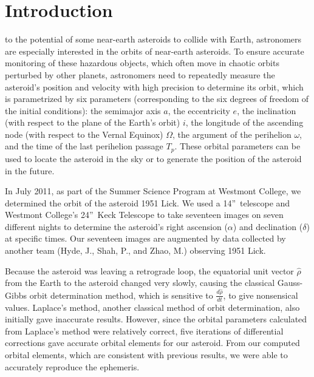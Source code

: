\documentclass[12pt,journal,compsoc]{IEEEtran}
\begin{document}
\IEEEdisplaynotcompsoctitleabstractindextext
\IEEEpeerreviewmaketitle

\section{Introduction}
to the potential of some near-earth asteroids to collide with Earth, 
astronomers are especially interested in the orbits of near-earth asteroids.
To ensure accurate monitoring of these hazardous objects, 
which often move in chaotic orbits perturbed by other planets, 
astronomers need to repeatedly measure the asteroid's position and velocity with high precision to determine its orbit,
which is parametrized by six parameters
(corresponding to the six degrees of freedom of the initial conditions): %
the semimajor axis $a$, 
the eccentricity $e$, 
the inclination (with respect to the plane of the Earth's orbit) $i$, 
the longitude of the ascending node (with respect to the Vernal Equinox) $\Omega$, 
the argument of the perihelion $\omega$, 
and the time of the last perihelion passage $T_p$.  
These orbital parameters can be used to locate the asteroid in the sky or to generate the position of the asteroid in the future.

In July 2011, as part of the Summer Science Program at Westmont College, 
we determined the orbit of the asteroid 1951 Lick. 
We used a 14''~telescope and Westmont College's 24''~Keck Telescope to take seventeen images on seven different nights 
to determine the asteroid's right ascension ($\alpha$) and declination ($\delta$) at specific times.
Our seventeen images are augmented by data collected by another team (Hyde, J., Shah, P., and Zhao, M.) observing 1951 Lick.

Because the asteroid was leaving a retrograde loop, 
the equatorial unit vector $\hat{\rho}$ from the Earth to the asteroid changed very slowly, 
causing the classical Gauss-Gibbs orbit determination method, which is sensitive to $\frac{d\hat{\rho}}{dt}$, to give nonsensical values.
Laplace's method, 
another classical method of orbit determination, 
also initially gave inaccurate results.  
However, since the orbital parameters calculated from Laplace's method were relatively correct, 
five iterations of differential corrections gave accurate orbital elements for our asteroid.
From our computed orbital elements, which are consistent with previous results, we were able to accurately reproduce the ephemeris.
\end{document}
